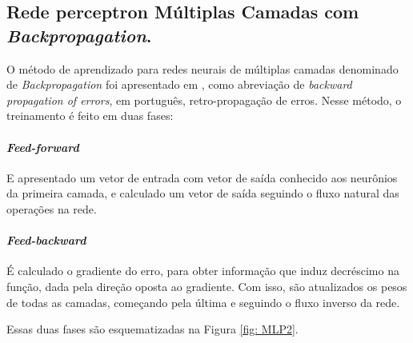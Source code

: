             \begin{figure}[ht]
            \end{figure}
    
        \subsection{Rede perceptron Múltiplas Camadas com \textit{Backpropagation}.}
    
            O método de aprendizado para redes neurais de múltiplas camadas denominado de \textit{Backpropagation} foi apresentado em \cite{backp}, como abreviação de \textit{backward propagation of errors}, em português, retro-propagação de erros. Nesse método, o treinamento é feito em duas fases:
        
            \paragraph*{\textit{ Feed-forward} } E apresentado um vetor de entrada com vetor de saída conhecido aos neurônios da primeira camada, e calculado um vetor de saída seguindo o fluxo natural das operações na rede.
             
            \paragraph*{\textit{Feed-backward}} É calculado o gradiente do erro, para obter informação que induz decréscimo na função, dada pela direção oposta ao gradiente. Com isso, são atualizados os pesos de todas as camadas, começando pela última e seguindo o fluxo inverso da rede.
             
            Essas duas fases são esquematizadas na Figura \ref{fig: MLP2}. 
             
